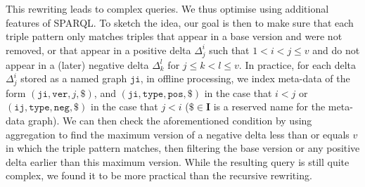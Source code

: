 \documentclass{llncs}
\newcommand{\I}{\ensuremath{\mathbf{I}}\xspace}
\begin{document}
This rewriting leads to complex queries. We thus optimise using additional features of SPARQL. To sketch the idea, our goal is then to make sure that each triple pattern only matches triples that appear in a base version and were not removed, or that appear in a positive delta $\Delta_{j}^{i}$ such that $1 < i < j \leq v$ and do not appear in a (later) negative delta $\Delta_{k}^{l}$ for $j \leq k < l \leq v$. In practice, for each delta $\Delta_{j}^{i}$ stored as a named graph $\texttt{ji}$, in offline processing, we index meta-data of the form $(\texttt{ji},\texttt{ver},j,\texttt{\$})$, and $(\texttt{ji},\texttt{type},\texttt{pos},\texttt{\$})$ in the case that $i < j$ or $(\texttt{ij},\texttt{type},\texttt{neg},\texttt{\$})$ in the case that $j < i$ ($\texttt{\$} \in \I$ is a reserved name for the meta-data graph). We can then check the aforementioned condition by using aggregation to find the maximum version of a negative delta less than or equals $v$ in which the triple pattern matches, then filtering the base version or any positive delta earlier than this maximum version. While the resulting query is still quite complex, we found it to be more practical than the recursive rewriting.
\end{document}
